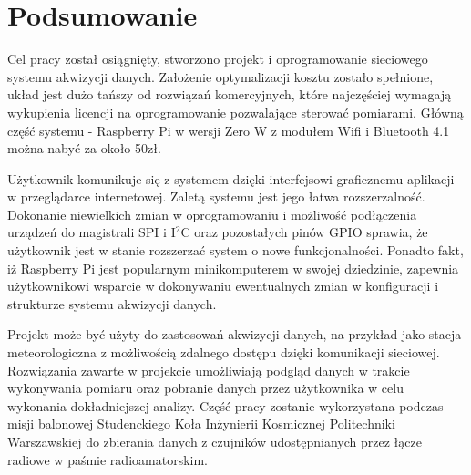 \chapter{Podsumowanie}
\label{ch:podsumowanie}


Cel pracy został osiągnięty, stworzono projekt i oprogramowanie sieciowego systemu akwizycji danych. Założenie optymalizacji kosztu zostało spełnione, układ jest dużo tańszy od rozwiązań komercyjnych, które najczęściej wymagają wykupienia licencji na oprogramowanie pozwalające sterować pomiarami. Główną część systemu - Raspberry Pi w wersji Zero W z modułem Wifi i Bluetooth 4.1 można nabyć za około 50zł.

Użytkownik komunikuje się z systemem dzięki interfejsowi graficznemu aplikacji w przeglądarce internetowej. Zaletą systemu jest jego łatwa rozszerzalność. Dokonanie niewielkich zmian w oprogramowaniu i możliwość podłączenia urządzeń do magistrali SPI i I$^2$C oraz pozostałych pinów GPIO sprawia, że użytkownik jest w stanie rozszerzać system o nowe funkcjonalności. Ponadto fakt, iż Raspberry Pi jest popularnym minikomputerem w swojej dziedzinie, zapewnia użytkownikowi wsparcie w dokonywaniu ewentualnych zmian w konfiguracji i strukturze systemu akwizycji danych. 

Projekt może być użyty do zastosowań akwizycji danych, na przykład jako stacja meteorologiczna z możliwością zdalnego dostępu dzięki komunikacji sieciowej. Rozwiązania zawarte w projekcie umożliwiają podgląd danych w trakcie wykonywania pomiaru oraz pobranie danych przez użytkownika w celu wykonania dokładniejszej analizy. Część pracy zostanie wykorzystana podczas misji balonowej Studenckiego Koła Inżynierii Kosmicznej Politechniki Warszawskiej do zbierania danych z czujników udostępnianych przez łącze radiowe w paśmie radioamatorskim.
